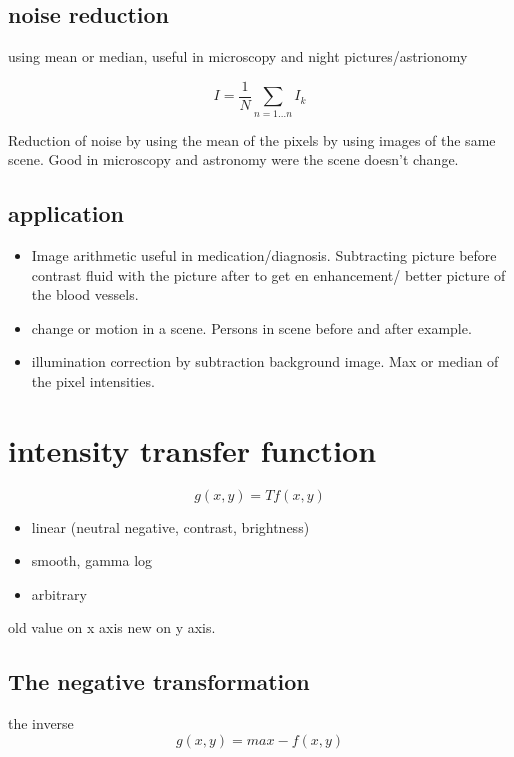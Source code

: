 \documentclass[a4paper]{article}
\begin{document}
\subsection{noise reduction}
using mean or median, useful in microscopy and night pictures/astrionomy

\begin{equation}
I =  \frac{1} {N} \sum_{n=1 \ldots n }I_k
\end{equation}

Reduction of noise by using the mean of the pixels by using images of the same scene. Good in microscopy and astronomy were the scene doesn't change. 

\subsection{application}

\begin{itemize}
    \item Image arithmetic useful in medication/diagnosis. Subtracting picture before contrast fluid with the picture after to get en enhancement/ better picture of the blood vessels. 
    \item change or motion in a scene. Persons in scene before and after example. 
    \item illumination correction by subtraction background image. Max or median of the pixel intensities. 
\end{itemize}


\section{intensity transfer function}

\begin{equation}
g(x,y) = Tf(x,y)
\end{equation}

\begin{itemize}
    \item linear (neutral negative, contrast, brightness)
    \item smooth, gamma log
    \item arbitrary
\end{itemize}

old value on x axis new on y axis.

\subsection{The negative transformation}
the inverse 
\begin{equation}
g(x,y) = max - f(x,y)
\end{equation}
\end{document}
